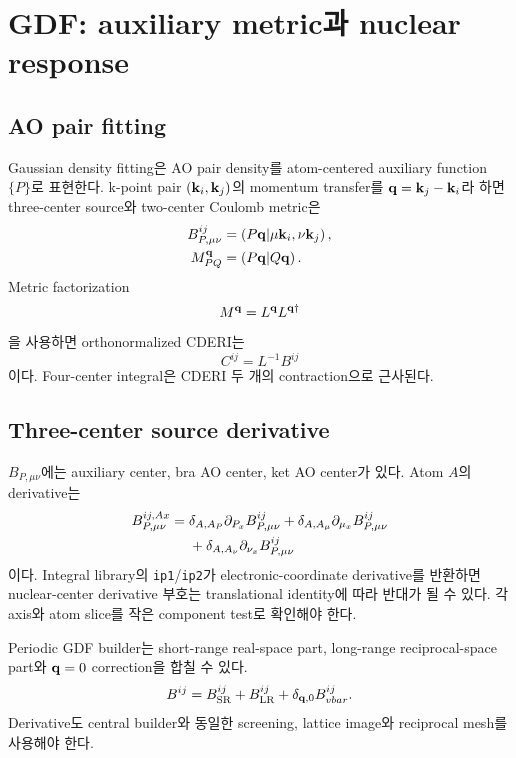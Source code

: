 \section{GDF: auxiliary metric과 nuclear response}
\label{sec:gdf}

\subsection{AO pair fitting}

Gaussian density fitting은 AO pair density를 atom-centered auxiliary function
$\{P\}$로 표현한다. k-point pair $(\mathbf{k}_i,\mathbf{k}_j)$의 momentum transfer를
$\mathbf{q}=\mathbf{k}_j-\mathbf{k}_i$라 하면 three-center source와 two-center Coulomb metric은
\begin{align}
  B_{P,\mu\nu}^{ij}
  &=\left(P\mathbf{q}\middle|\mu\mathbf{k}_i,\nu\mathbf{k}_j\right),
  \label{eq:gdf-three-center}\\
  M_{PQ}^{\mathbf{q}}
  &=\left(P\mathbf{q}\middle|Q\mathbf{q}\right).
  \label{eq:gdf-two-center}
\end{align}
Metric factorization
\begin{equation}
  M^{\mathbf{q}}=L^{\mathbf{q}}L^{\mathbf{q}\dagger}
  \label{eq:gdf-cholesky}
\end{equation}
을 사용하면 orthonormalized CDERI는
\begin{equation}
  C^{ij}=L^{-1}B^{ij}
  \label{eq:gdf-cderi}
\end{equation}
이다. Four-center integral은 CDERI 두 개의 contraction으로 근사된다.

\subsection{Three-center source derivative}

$B_{P,\mu\nu}$에는 auxiliary center, bra AO center, ket AO center가 있다. Atom $A$의
derivative는
\begin{align}
  B_{P,\mu\nu}^{ij,Ax}
  ={}&\delta_{A,A_P}\partial_{P_x}B_{P,\mu\nu}^{ij}
    +\delta_{A,A_\mu}\partial_{\mu_x}B_{P,\mu\nu}^{ij}
  \notag\\
   &+\delta_{A,A_\nu}\partial_{\nu_x}B_{P,\mu\nu}^{ij}
  \label{eq:gdf-source-centers}
\end{align}
이다. Integral library의 \texttt{ip1}/\texttt{ip2}가 electronic-coordinate derivative를 반환하면
nuclear-center derivative 부호는 translational identity에 따라 반대가 될 수 있다.
각 axis와 atom slice를 작은 component test로 확인해야 한다.

Periodic GDF builder는 short-range real-space part, long-range reciprocal-space part와
$\mathbf{q}=0$ correction을 합칠 수 있다.
\begin{equation}
  B^{ij}=B_{\mathrm{SR}}^{ij}+B_{\mathrm{LR}}^{ij}
  +\delta_{\mathbf{q},0}B_{vbar}^{ij}.
  \label{eq:gdf-source-parts}
\end{equation}
Derivative도 central builder와 동일한 screening, lattice image와 reciprocal mesh를
사용해야 한다.

